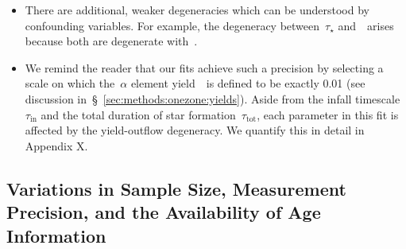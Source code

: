 \documentclass[ms.tex]{subfiles}
\begin{document}
\begin{itemize}
	\item There are additional, weaker degeneracies which can be understood
	by confounding variables.
	For example, the degeneracy between~$\tau_\star$ and~\yfeia~arises because
	both are degenerate with~\yfecc.

	\item We remind the reader that our fits achieve such a precision by
	selecting a scale on which the~$\alpha$ element yield~\yacc~is defined to
	be exactly 0.01 (see discussion in~\S~\ref{sec:methods:onezone:yields}).
	Aside from the infall timescale~$\tau_\text{in}$ and the total duration of
	star formation~$\tau_\text{tot}$, each parameter in this fit is affected by
	the yield-outflow degeneracy.
	We quantify this in detail in Appendix X.

\end{itemize}

\subsection{Variations in Sample Size, Measurement Precision, and the
Availability of Age Information}
\label{sec:mocks:variations}


\end{document}

